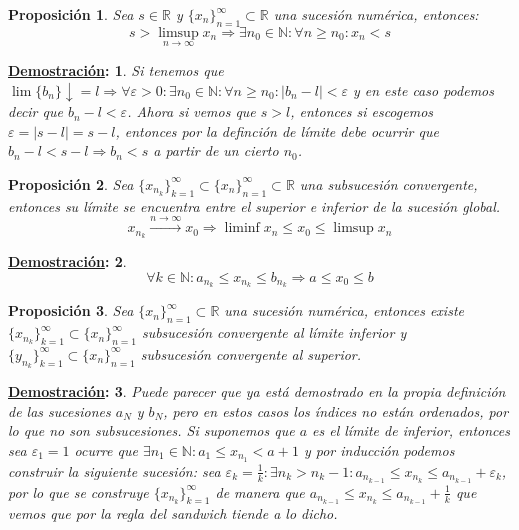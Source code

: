 \documentclass[10pt,a4paper,openright]{book}
\theoremstyle{break}
\newtheorem*{prop}{Proposición}
\newtheorem*{demo}{\underline{Demostración}:}
\begin{document}
\begin{prop}
Sea $s\in \mathbb{R}$ y $\{x_n\}_{n=1}^\infty\subset \mathbb{R}$ una sucesión numérica, entonces:
$$s > \limsup_{n\rightarrow\infty} x_n \Rightarrow \exists n_0 \in \mathbb{N} : \forall n \geq n_0: x_n<s$$
\end{prop}
\begin{demo}
Si tenemos que $\lim \{b_n\}\downarrow = l\Rightarrow \forall \varepsilon>0 : \exists n_0\in \mathbb N: \forall n\geq n_0: |b_n-l|<\varepsilon $ y en este caso podemos decir que $b_n-l<\varepsilon$. Ahora si vemos que $s>l$, entonces si escogemos $\varepsilon = |s-l|=s-l$, entonces por la definción de límite debe ocurrir que $b_n-l<s-l\Rightarrow b_n<s$ a partir de un cierto $n_0$.
\end{demo}

\begin{prop}
Sea $\{x_{n_k}\}_{k=1}^\infty\subset \{x_n\}_{n=1}^\infty\subset \mathbb{R}$ una subsucesión convergente, entonces su límite se encuentra entre el superior e inferior de la sucesión global.
$$ x_{n_k}\xrightarrow{n\rightarrow\infty}x_0 \Rightarrow \liminf x_n \leq x_0 \leq \limsup x_n$$
\end{prop}
\begin{demo}
$$\forall k\in \mathbb N: a_{n_k}\leq x_{n_k} \leq b_{n_k} \Rightarrow a\leq x_0 \leq b$$
\end{demo}

\begin{prop}
Sea $\{x_n\}_{n=1}^\infty \subset \mathbb{R}$ una sucesión numérica, entonces existe $\{x_{n_k}\}_{k=1}^\infty\subset \{x_n\}_{n=1}^\infty$ subsucesión convergente al límite inferior y $\{y_{n_k}\}_{k=1}^\infty\subset \{x_n\}_{n=1}^\infty$ subsucesión convergente al superior.
\end{prop}
\begin{demo}
Puede parecer que ya está demostrado en la propia definición de las sucesiones $a_N$ y $b_N$, pero en estos casos los índices no están ordenados, por lo que no son subsucesiones.
Si suponemos que $a$ es el límite de inferior, entonces sea $\varepsilon_1=1$ ocurre que $\exists n_1\in \mathbb N: a_1\leq x_{n_1}<a+1$ y por inducción podemos construir la siguiente sucesión: sea $\varepsilon_k= \frac{1}{k} : \exists n_k > n_k -1: a_{n_{k-1}}\leq x_{n_k}\leq a_{n_{k-1}}+\varepsilon_k$, por lo que se construye $\{x_{n_k}\}_{k=1}^\infty$ de manera que $a_{n_{k-1}}\leq x_{n_k}\leq a_{n_{k-1}}+\frac{1}{k}$ que vemos que por la regla del sandwich tiende a lo dicho.
\end{demo}
\end{document}
